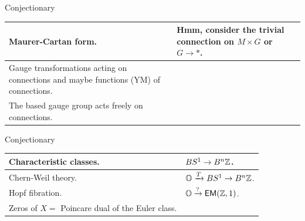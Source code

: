 \documentclass[13pt,aspectratio=169,hyperref={hypertexnames = false}]{beamer}
\begin{document}
\begin{frame}{Conjectionary}
\begin{tabular}{p{17em}|p{17em}}
\hline
Maurer-Cartan form. & Hmm, consider the trivial connection on \( M\times G \) or \( G\to * \).\\ \hline
Gauge transformations acting on connections and maybe functions (YM) of connections. & \\ \hline
The based gauge group acts freely on connections. & \\ \hline
\end{tabular}
\end{frame}

\begin{frame}{Conjectionary}
\begin{tabular}{p{17em}|p{17em}}
\hline
Characteristic classes. & \( BS^1\to B^n\mathbb{Z} \).\\ \hline
Chern-Weil theory. & \( \mathbb{O}\xrightarrow[]{T}BS^1\to B^n\mathbb{Z} \). \\ \hline
Hopf fibration. & \( \mathbb{O}\xrightarrow[]{?}\mathsf{EM}(\mathbb{Z},1) \).  \\ \hline
Zeros of \( X = \) Poincare dual of the Euler class. & \\ \hline
\end{tabular}
\end{frame}
\end{document}
